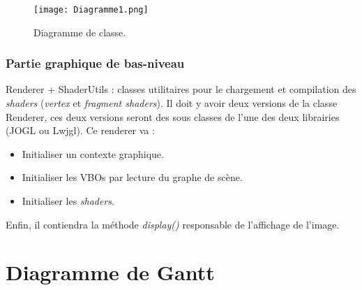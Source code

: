 \documentclass[11pt]{report}
\begin{document}
\begin{figure}[h!]
  \caption{Diagramme de classe.}
  \centering
    \texttt{[image: Diagramme1.png]}
\end{figure}
 




\subsection{Partie graphique de bas-niveau}
Renderer + ShaderUtils : classes utilitaires pour le chargement et compilation des \textit{shaders} (\textit{vertex} et \textit{fragment shaders}).
Il doit y avoir deux versions de la classe Renderer, ces deux versions seront des sous classes de l'une des deux librairies (JOGL ou Lwjgl).
Ce renderer va :
\begin{itemize}
\item Initialiser un contexte graphique. %
\item Initialiser les VBOs par lecture du graphe de scène.
\item Initialiser les \textit{shaders}. %
\end{itemize}
Enfin, il contiendra la méthode \textit{display()} responsable de l'affichage de l'image.



  

\chapter{Diagramme de Gantt} %
\end{document}
